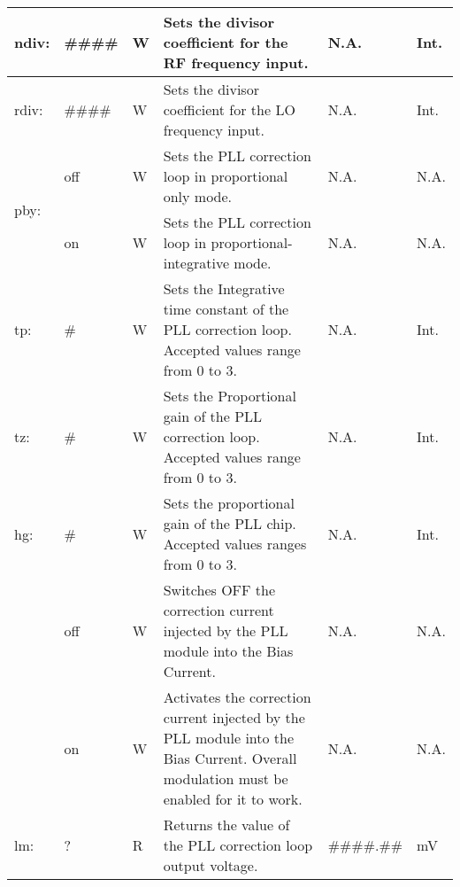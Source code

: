 \begin{center}
\begin{longtable}{| m{} | m{} | m{} | m{} | m{}| m{} |}
    ndiv: & \#\#\#\# & W & Sets the divisor coefficient for the RF frequency input. & N.A. & Int. \\
    \hline
    
    rdiv: & \#\#\#\# & W & Sets the divisor coefficient for the LO frequency input. & N.A. & Int. \\
    \hline
    
    \multirow{2}{0.1\textwidth}{pby:}   & off & W & Sets the PLL correction loop in proportional only mode. & N.A. & N.A. \\
                                        \cline{2-6}
                                        & on & W & Sets the PLL correction loop in proportional-integrative mode. & N.A. & N.A.\\
    \hline
    
    tp: & \# & W & Sets the Integrative time constant of the PLL correction loop. Accepted values range from 0 to 3. & N.A. & Int. \\
    \hline
    
    tz: & \# & W & Sets the Proportional gain of the PLL correction loop. Accepted values range from 0 to 3. & N.A. & Int. \\
    \hline
    
    hg: & \# & W & Sets the proportional gain of the PLL chip. Accepted values ranges from 0 to 3. & N.A. & Int. \\
    \hline
    
    \newpage
    
    \hline
    \multirow{2}{0.1\textwidth}{lk:}   & off & W & Switches OFF the correction current injected by the PLL module into the Bias Current. & N.A. & N.A. \\
                                        \cline{2-6}
                                        & on & W & Activates the correction current injected by the PLL module into the Bias Current. Overall modulation must be enabled for it to work. & N.A. & N.A.\\
    \hline
    
    lm: & ? & R & Returns the value of the PLL correction loop output voltage. & \#\#\#\#.\#\# & mV \\
    \hline
    
    \end{longtable}
\end{center}

\newpage





